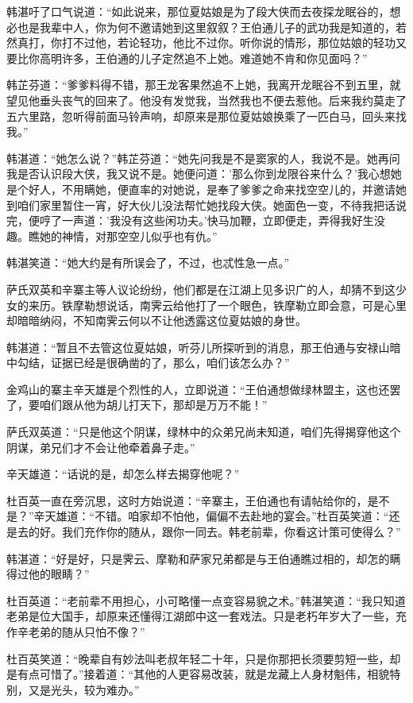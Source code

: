 \documentclass[12pt,oneside]{book}
\begin{document}
韩湛吁了口气说道：``如此说来，那位夏姑娘是为了段大侠而去夜探龙眠谷的，想必也是我辈中人，你为何不邀请她到这里叙叙？王伯通儿子的武功我是知道的，若然真打，你打不过他，若论轻功，他比不过你。听你说的情形，那位姑娘的轻功又要比你高明许多，王伯通的儿子定然追不上她。难道她不肯和你见面吗？''

韩芷芬道：``爹爹料得不错，那王龙客果然追不上她，我离开龙眠谷不到五里，就望见他垂头丧气的回来了。他没有发觉我，当然我也不便去惹他。后来我约莫走了五六里路，忽听得前面马铃声响，却原来是那位夏姑娘换乘了一匹白马，回头来找我。''

韩湛道：``她怎么说？''韩芷芬道：``她先问我是不是窦家的人，我说不是。她再问我是否认识段大侠，我又说不是。她便问道：'那么你到龙限谷来什么？'我心想她是个好人，不用瞒她，便直率的对她说，是奉了爹爹之命来找空空儿的，并邀请她到咱们家里暂住一宵，好大伙儿没法帮忙她找段大侠。她面色一变，不待我把话说完，便哼了一声道：'我没有这些闲功夫。'快马加鞭，立即便走，弄得我好生没趣。瞧她的神情，对那空空儿似乎也有仇。''

韩湛笑道：``她大约是有所误会了，不过，也忒性急一点。''

萨氏双英和辛寨主等人议论纷纷，他们都是在江湖上见多识广的人，却猜不到这少女的来历。铁摩勒想说话，南霁云给他打了一个眼色，铁摩勒立即会意，可是心里却暗暗纳闷，不知南霁云何以不让他透露这位夏姑娘的身世。

韩湛道：``暂且不去管这位夏姑娘，听芬儿所探听到的消息，那王伯通与安禄山暗中勾结，证据已经是很确凿的了，那么，咱们该怎么办？''

金鸡山的寨主辛天雄是个烈性的人，立即说道：``王伯通想做绿林盟主，这也还罢了，要咱们跟从他为胡儿打天下，那却是万万不能！''

萨氏双英道：``只是他这个阴谋，绿林中的众弟兄尚未知道，咱们先得揭穿他这个阴谋，弟兄们才不会让他牵着鼻子走。''

辛天雄道：``话说的是，却怎么样去揭穿他呢？''

杜百英一直在旁沉思，这时方始说道：``辛寨主，王伯通也有请帖给你的，是不是？''辛天雄道：``不错。咱家却不怕他，偏偏不去赴地的宴会。''杜百英笑道：``还是去的好。我们充作你的随从，跟你一同去。韩老前辈，你看这计策可使得么？''

韩湛道：``好是好，只是霁云、摩勒和萨家兄弟都是与王伯通瞧过相的，却怎的瞒得过他的眼睛？''

杜百英道：``老前辈不用担心，小可略懂一点变容易貌之术。''韩湛笑道：``我只知道老弟是位大国手，却原来还懂得江湖郎中这一套戏法。只是老朽年岁大了一些，充作辛老弟的随从只怕不像？''

杜百英笑道：``晚辈自有妙法叫老叔年轻二十年，只是你那把长须要剪短一些，却是有点可惜了。''接着道：``其他的人更容易改装，就是龙藏上人身材魁伟，相貌特别，又是光头，较为难办。''
\end{document}
